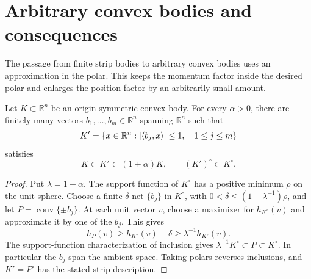 \section{Arbitrary convex bodies and consequences}
\label{sec:approximation}

The passage from finite strip bodies to arbitrary convex bodies uses an approximation in the polar. This keeps the momentum factor inside the desired polar and enlarges the position factor by an arbitrarily small amount.

\begin{lemma}
\label{lem:polar-approximation}
Let $K\subset\mathbb{R}^n$ be an origin-symmetric convex body. For every $\alpha>0$, there are finitely many vectors $b_1,\ldots,b_m\in\mathbb{R}^n$ spanning $\mathbb{R}^n$ such that
\[
 K'=\{x\in\mathbb{R}^n:|\langle b_j,x\rangle|\le1,\quad 1\le j\le m\}
\]
satisfies
\begin{equation}\label{eq:polar-approximation}
 K\subset K'\subset(1+\alpha)K,
 \qquad (K')^\circ\subset K^\circ.
\end{equation}
\end{lemma}

\begin{proof}
Put $\lambda=1+\alpha$. The support function of $K^\circ$ has a positive minimum $\rho$ on the unit sphere. Choose a finite $\delta$-net $\{b_j\}$ in $K^\circ$, with $0<\delta\leq(1-\lambda^{-1})\rho$, and let $P=\operatorname{conv}\{\pm b_j\}$. At each unit vector $v$, choose a maximizer for $h_{K^\circ}(v)$ and approximate it by one of the $b_j$. This gives
\[
 h_P(v)\geq h_{K^\circ}(v)-\delta\geq\lambda^{-1}h_{K^\circ}(v).
\]
The support-function characterization of inclusion gives $\lambda^{-1}K^\circ\subset P\subset K^\circ$. In particular the $b_j$ span the ambient space. Taking polars reverses inclusions, and $K'=P^\circ$ has the stated strip description.
\end{proof}

